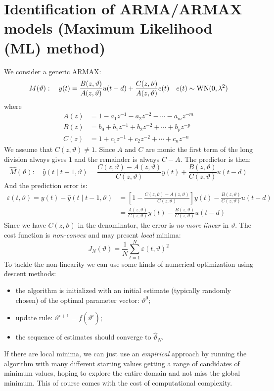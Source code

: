 
\section{Identification of ARMA/ARMAX models (Maximum Likelihood (ML) method)}

We consider a generic ARMAX:
\[
	M(\vartheta ): \quad y(t)=\frac{B(z,\vartheta )}{A(z,\vartheta)} u(t-d)+\frac{C(z,\vartheta )}{A(z,\vartheta)}e(t)\quad e(t)\sim \operatorname{WN}(0,\lambda^2)
\]
where
\begin{align*}
	A(z)&=1-a_{1} z^{-1}-a_{2} z^{-2}-\cdots-a_{m} z^{-m} \\
	B(z)&=b_{0}+b_{1} z^{-1}+b_{2} z^{-2}+\cdots+b_{p} z^{-p} \\
	C(z)&=1+c_{1} z^{-1}+c_{2} z^{-2}+\cdots+c_{n} z^{-n}
\end{align*}
We assume that $C(z,\vartheta)\neq 1$. Since $A$ and $C$ are monic the first term of the long division always gives $1$ and the remainder is always $C-A$. The predictor is then:
\[
	\hat{M}(\vartheta): \quad \hat{y}(t \mid t-1, \vartheta)=\frac{C(z,\vartheta)-A(z,\vartheta)}{C(z,\vartheta)} y(t)+\frac{B(z,\vartheta)}{C(z,\vartheta)} u(t-d)
\]
And the prediction error is:
\begin{align*}
	\varepsilon(t, \vartheta)=y(t)-\hat{y}(t \mid t-1, \vartheta)&=\left[1-\frac{C(z,\vartheta)-A(z,\vartheta)}{C(z,\vartheta)}\right] y(t)-\frac{B(z,\vartheta)}{C(z,\vartheta)} u(t-d)\\
	&=\frac{A(z,\vartheta)}{C(z,\vartheta)} y(t)-\frac{B(z,\vartheta)}{C(z,\vartheta)} u(t-d)
\end{align*}
Since we have $C(z,\vartheta)$ in the denominator, the error is \emph{no more linear} in $\vartheta$.
The cost function is \emph{non-convex} and may present \emph{local} minima:
\[
	J_{N}(\vartheta)=\frac{1}{N} \sum_{t=1}^{N} \varepsilon(t, \vartheta)^{2}
\]
To tackle the non-linearity we can use some kinds of numerical optimization using descent methods:
\begin{itemize}
	\item the algorithm is initialized with an initial estimate (typically randomly chosen) of the optimal parameter vector: $\vartheta^{0}$;
	\item update rule: $\vartheta^{i+1} = f (\vartheta^{i})$;
	\item the sequence of estimates should converge to $\hat\vartheta_{N}$.
\end{itemize}
If there are local minima, we can just use an \emph{empirical} approach by running the algorithm with many different starting values getting a range of candidates of minimum values, hoping to explore the entire domain and not miss the global minimum. This of course comes with the cost of computational complexity.


